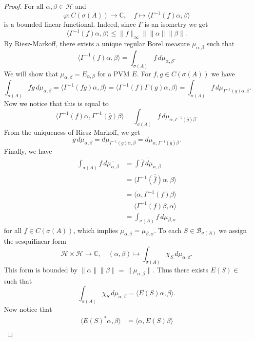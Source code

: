 \documentclass[10pt, a4paper]{article}
\newenvironment{noticeC}{%
  \tcolorbox[%
  notitle,
  empty,
  enhanced,  %
  breakable,
  coltext=black, 
  fontupper=\rmfamily,
  noparskip,
  sharp corners,
  boxrule=-1pt,  %
  frame hidden,
  left=7pt,  %
  right=7pt,
  top=5pt,
  bottom=5pt,
  before skip=2.5ex plus 2pt,
  after skip=2.5ex plus 2pt,
  overlay unbroken and last={%
  },
  ]}
{\endtcolorbox}
\newenvironment{myproof}%
  {\begin{noticeC}\begin{proof}}%
  {\end{proof}\end{noticeC}}
\newcommand{\C}{\mathbb {C}}
\DeclareMathOperator{\bh}{\mathcal{B} (\mathcal{H})}
\begin{document}
\begin{myproof}
  For all $\alpha, \beta \in \mathcal{H}$ and 
  $$\varphi: C(\sigma(A)) \to \C,\quad f \mapsto \langle \Gamma^{-1} (f) \alpha, \beta\rangle$$
  is a bounded linear functional. Indeed, since $\Gamma$ is an isometry we get
  $$\langle \Gamma^{-1} (f) \alpha, \beta\rangle \leq \| f\|_{\infty} \|  \|\alpha\| \| \beta\|.$$
  By Riesz-Markoff, there exists a unique regular Borel measure $\mu_{\alpha, \beta}$ such that
  $$\langle \Gamma^{-1} (f) \alpha, \beta\rangle = \int_{\sigma(A)} f\, d\mu_{\alpha, \beta}.$$
  We will show that $\mu_{\alpha, \beta} = E_{\alpha, \beta}$ for a PVM $E$.
  For $f, g \in C(\sigma(A))$ we have 
  $$\int_{\sigma(A)} fg\, d\mu_{\alpha, \beta} = \langle \Gamma^{-1}(fg) \alpha, \beta\rangle = \langle \Gamma^{-1} (f) \Gamma(g) \alpha, \beta \rangle = \int_{\sigma(A)} f\, d\mu_{\Gamma^{-1} (g) \alpha, \beta}.$$
  Now we notice that this is equal to 
  $$\langle \Gamma^{-1} (f) \alpha, \Gamma^{-1} (\overline{g}) \beta \rangle = \int_{\sigma(A)} f\, d\mu_{\alpha, \Gamma^{-1} (\overline{g}) \beta}.$$
  From the uniqueness of Riesz-Markoff, we get 
  $$g\, d{\mu_{\alpha, \beta}} = d\mu_{\Gamma^{-1} (g) \alpha, \beta} = d\mu_{\alpha, \Gamma^{-1}(\overline{g})\beta}.$$
  Finally, we have
  \begin{align*}
    \int_{\sigma(A)} f \, d\overline{\mu_{\alpha, \beta}} &= \overline{\int \overline{f}\, d\mu_{\alpha, \beta}}\\
    &= \overline{\langle \Gamma^{-1} (\overline{f}) \alpha, \beta \rangle}\\
    &= \overline{\langle \alpha, \Gamma^{-1} (f) \beta \rangle}\\
    &= \langle \Gamma^{-1} (f) \beta, \alpha\rangle\\
    &= \int_{\sigma(A)} f\, d\mu_{\beta, \alpha}
  \end{align*}
  for all $f \in C(\sigma(A))$, which implies $\overline{\mu_{\alpha, \beta}} = \mu_{\beta, \alpha}$. 
  To each $S \in \mathcal{B}_{\sigma(A)}$ we assign the sesquilinear form 
  $$\mathcal{H} \times \mathcal{H} \to \C,\quad (\alpha, \beta) \mapsto \int_{\sigma(A)} \chi_S \, d\mu_{\alpha, \beta}.$$
  This form is bounded by $\|\alpha\| \|\beta\| = \|\mu_{\alpha, \beta}\|$.
  Thus there exists $E(S) \in \bh$ such that 
  $$\int_{\sigma(A)}\chi_S \, d\mu_{\alpha, \beta} = \langle E(S) \alpha, \beta\rangle.$$
  Now notice that 
  \begin{align*}
    \langle E(S)^* \alpha, \beta \rangle &= \langle \alpha, E(S) \beta\rangle\\

\end{align*}
\end{myproof}
\end{document}
